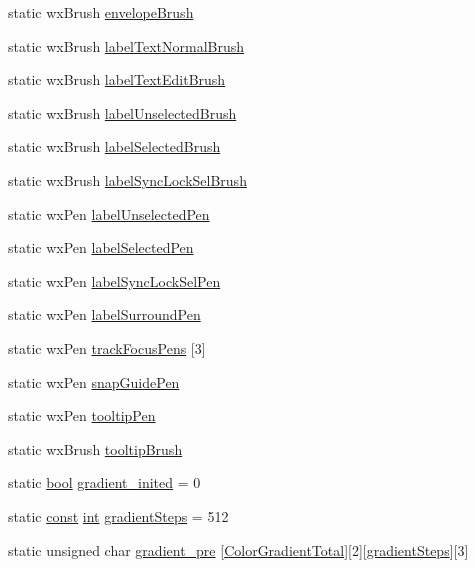 \begin{DoxyCompactItemize}
\item 
static wx\+Brush \hyperlink{class_a_color_a725a9c00622fbc99047ea1290ec98320}{envelope\+Brush}
\item 
static wx\+Brush \hyperlink{class_a_color_a740811e4659d575a0c59a9ec1567ec60}{label\+Text\+Normal\+Brush}
\item 
static wx\+Brush \hyperlink{class_a_color_a7a5e22309e972fa25480cfa378d95a40}{label\+Text\+Edit\+Brush}
\item 
static wx\+Brush \hyperlink{class_a_color_aaa92124859c6703dc9ff1ef31434be56}{label\+Unselected\+Brush}
\item 
static wx\+Brush \hyperlink{class_a_color_a08240cbb4322e9f5725e865033c1f37a}{label\+Selected\+Brush}
\item 
static wx\+Brush \hyperlink{class_a_color_a96e75446438acc86828661c456756566}{label\+Sync\+Lock\+Sel\+Brush}
\item 
static wx\+Pen \hyperlink{class_a_color_af42c7ce11d8c08e3ca1342af16829649}{label\+Unselected\+Pen}
\item 
static wx\+Pen \hyperlink{class_a_color_a9ca02150c98cdbf59c466c44902e9eca}{label\+Selected\+Pen}
\item 
static wx\+Pen \hyperlink{class_a_color_af9f21ecd91e87a8f53a24e45b8bcd536}{label\+Sync\+Lock\+Sel\+Pen}
\item 
static wx\+Pen \hyperlink{class_a_color_a51810ca58729b5c17e07f8aedca690fc}{label\+Surround\+Pen}
\item 
static wx\+Pen \hyperlink{class_a_color_a265f520d190288cc500560728745e48f}{track\+Focus\+Pens} \mbox{[}3\mbox{]}
\item 
static wx\+Pen \hyperlink{class_a_color_aba299a723fba676837624634673a075f}{snap\+Guide\+Pen}
\item 
static wx\+Pen \hyperlink{class_a_color_a608f78268295b262d6157a4a41e2cc68}{tooltip\+Pen}
\item 
static wx\+Brush \hyperlink{class_a_color_a9ce00f8c3989de47d75b643dd36734fe}{tooltip\+Brush}
\item 
static \hyperlink{mac_2config_2i386_2lib-src_2libsoxr_2soxr-config_8h_abb452686968e48b67397da5f97445f5b}{bool} \hyperlink{class_a_color_af4e9e5c98828505ce2617cc16659ee3e}{gradient\+\_\+inited} = 0
\item 
static \hyperlink{getopt1_8c_a2c212835823e3c54a8ab6d95c652660e}{const} \hyperlink{xmltok_8h_a5a0d4a5641ce434f1d23533f2b2e6653}{int} \hyperlink{class_a_color_a8798d17ce9eaaf61a9d91525f0fa632c}{gradient\+Steps} = 512
\item 
static unsigned char \hyperlink{class_a_color_a198d820095e3b59e4db026695ad092a2}{gradient\+\_\+pre} \mbox{[}\hyperlink{class_a_color_a3a1a5b4ab4055f09810d58a166f61bfea2c26e4fa9bddb6b55415066260d4fcb9}{Color\+Gradient\+Total}\mbox{]}\mbox{[}2\mbox{]}\mbox{[}\hyperlink{class_a_color_a8798d17ce9eaaf61a9d91525f0fa632c}{gradient\+Steps}\mbox{]}\mbox{[}3\mbox{]}
\end{DoxyCompactItemize}


